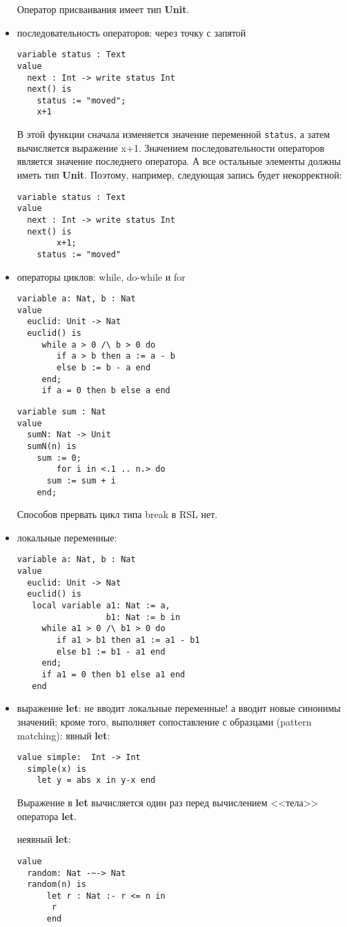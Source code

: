 \documentclass[14pt, twoside]{extreport}
\begin{document}
\begin{itemize}
Оператор присваивания имеет тип \textbf{Unit}.

\item последовательность операторов: через точку с запятой
\begin{lstlisting}
variable status : Text
value
  next : Int -> write status Int
  next() is 
	status := "moved";
	x+1	
\end{lstlisting}
В этой функции сначала изменяется значение переменной \texttt{status}, а затем вычисляется выражение x+1. Значением последовательности операторов является значение последнего оператора. А все остальные элементы должны иметь тип \textbf{Unit}. Поэтому, например, следующая запись будет некорректной:
\begin{lstlisting}
variable status : Text
value
  next : Int -> write status Int
  next() is 
        x+1;
	status := "moved"
\end{lstlisting}

\item операторы циклов: while, do-while и for
\begin{lstlisting}
variable a: Nat, b : Nat
value
  euclid: Unit -> Nat
  euclid() is
     while a > 0 /\ b > 0 do
        if a > b then a := a - b
        else b := b - a end
     end;
     if a = 0 then b else a end   
\end{lstlisting}

\begin{lstlisting}
variable sum : Nat
value
  sumN: Nat -> Unit
  sumN(n) is
	sum := 0;
        for i in <.1 .. n.> do
	  sum := sum + i
	end;
\end{lstlisting}

Способов прервать цикл типа break в RSL нет.

\item локальные переменные:
\begin{lstlisting}
variable a: Nat, b : Nat
value
  euclid: Unit -> Nat
  euclid() is
   local variable a1: Nat := a,
                  b1: Nat := b in
     while a1 > 0 /\ b1 > 0 do
        if a1 > b1 then a1 := a1 - b1
        else b1 := b1 - a1 end
     end;
     if a1 = 0 then b1 else a1 end
   end
\end{lstlisting}

\item выражение \textbf{let}: не вводит локальные переменные! а вводит новые синонимы значений; кроме того, выполняет сопоставление с образцами (pattern matching):
явный \textbf{let}:
\begin{lstlisting}
value simple:  Int -> Int
  simple(x) is
    let y = abs x in y-x end 
\end{lstlisting}

Выражение в \textbf{let} вычисляется один раз перед вычислением <<тела>> оператора \textbf{let}.

неявный \textbf{let}:
\begin{lstlisting}
value
  random: Nat -~-> Nat
  random(n) is
      let r : Nat :- r <= n in
	   r
      end	
\end{lstlisting}

\end{itemize}
\end{document}
